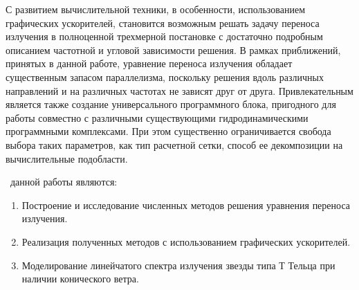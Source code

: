 С развитием вычислительной техники, в особенности, использованием графических ускорителей, становится возможным решать задачу переноса излучения в полноценной трехмерной постановке с достаточно подробным описанием частотной и угловой зависимости решения. В рамках приближений, принятых в данной работе, уравнение переноса излучения обладает существенным запасом параллелизма, поскольку решения вдоль различных направлений и на различных частотах не зависят друг от друга. Привлекательным является также создание универсального программного блока, пригодного для работы совместно с различными существующими гидродинамическими программными комплексами. При этом существенно ограничивается свобода выбора таких параметров, как тип расчетной сетки, способ ее декомпозиции на вычислительные подобласти.

 \aim\ данной работы являются:
\begin{enumerate}
  \item Построение и исследование численных методов решения уравнения переноса излучения.
  \item Реализация полученных методов с использованием графических ускорителей.
  \item Моделирование линейчатого спектра излучения звезды типа Т Тельца при наличии конического ветра. 
\end{enumerate}

